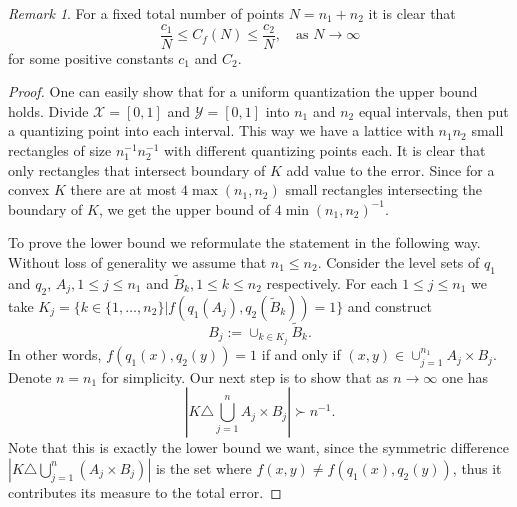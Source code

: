 \documentclass{amsart}
\theoremstyle{remark}
\newtheorem{remark}[theorem]{Remark}
\numberwithin{equation}{section}
\numberwithin{figure}{section}
\begin{document}
\begin{remark}
	For a fixed total number of points $N = n_1 + n_2$ it is clear that
	\[
	\frac{c_1}{N} \leq  C_f(N)\leq   \frac{c_2}{N}, \quad \mbox{as } N\to\infty
	\]
	for some positive constants $c_1$ and $C_2$. 
\end{remark}

\begin{proof}
	One can easily show that for a uniform quantization the upper bound holds. Divide $\mathcal{X} = [0, 1]$ and $\mathcal{Y} = [0, 1]$ into $n_1$ and $n_2$ equal intervals, then put a quantizing point into each interval. This way we have a lattice with $n_1 n_2$ small rectangles of size $n_1^{-1} n_2^{-1}$ with different quantizing points each. It is clear that only rectangles that intersect boundary of $K$ add value to the error. Since for a convex $K$ there are at most $4 \max(n_1, n_2)$ small rectangles intersecting the boundary of $K$, we get the upper bound of $4 \min(n_1, n_2)^{-1}$.
	
	To prove the lower bound we reformulate the statement in the following way. Without loss of generality we assume that $n_1 \leq n_2$. Consider the level sets of $q_1$ and $q_2$, $A_j, 1\leq j \leq n_1$ and $\tilde B_k, 1\leq k \leq n_2$ respectively. For each $1\leq j \leq n_1$ we take $K_j = \{k \in \{1, \ldots, n_2\} | f(q_1(A_j), q_2(\tilde B_k)) = 1 \}$ and construct 
	\[
	B_j := \cup_{k \in K_j} \tilde B_k.
	\]
	In other words, $f(q_1(x), q_2(y)) = 1$ if and only if $(x, y) \in \cup_{j=1}^{n_1} A_j\times B_j$. Denote $n = n_1$ for simplicity. Our next step is to show that as $n \to \infty$ one has
	\[
	|K \triangle \bigcup_{j=1}^n A_j\times B_j| \succ n^{-1}.
	\]
	Note that this is exactly the lower bound we want, since the symmetric difference  $|K \triangle \bigcup_{j=1}^n (A_j\times B_j)|$ is the set where $f(x, y) \neq f(q_1(x), q_2(y))$, thus it contributes its measure to the total error.
	

\end{proof}
\end{document}
